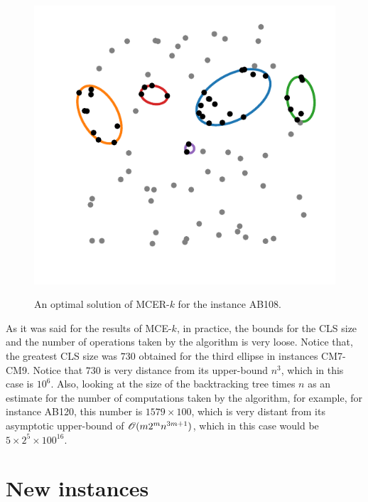 \begin{figure}[!htb]
	\centering
	\caption{An optimal solution of MCER-$k$ for the instance AB108.}
	\includegraphics[scale=.8]{tex/figures/AB108}
	\fautor
	\label{fig:AB108}
\end{figure}

As it was said for the results of MCE-$k$, in practice, the bounds for the CLS size and the number of operations taken by the algorithm is very loose.
Notice that, the greatest CLS size was $730$ obtained for the third ellipse in instances CM7-CM9. Notice that $730$ is very distance from its upper-bound $n^3$, which in this case is $10^6$.
Also, looking at the size of the backtracking tree times $n$ as an estimate for the number of computations taken by the algorithm, for example, for instance AB120, this number is $1579 \times 100$, which is very distant from its asymptotic upper-bound of $\mathscr{O}(m2^mn^{3m+1})$, which in this case would be $5\times 2^5 \times 100 ^ {16}$.


\section{New instances}

